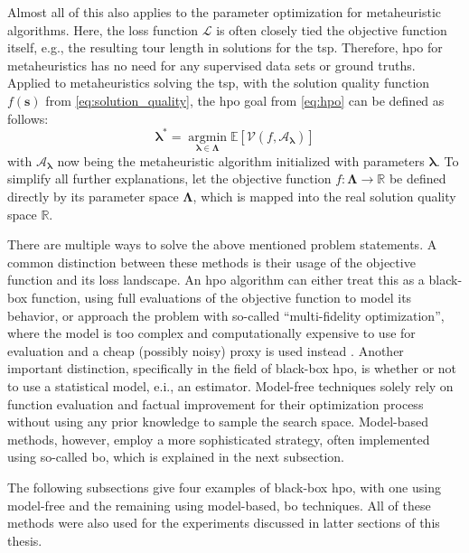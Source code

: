 Almost all of this also applies to the parameter optimization for metaheuristic algorithms. Here, the loss function $\mathcal{L}$ is often closely tied the objective function itself, e.g., the resulting tour length in solutions for the \gls{tsp}. Therefore, \gls{hpo} for metaheuristics has no need for any supervised data sets or ground truths. Applied to metaheuristics solving the \gls{tsp}, with the solution quality function $f(\mathbf{s})$ from \cref{eq:solution_quality}, the \gls{hpo} goal from \cref{eq:hpo} can be defined as follows:
\begin{equation}
	\mathbf{\lambda^*} = \operatorname*{argmin}_{\mathbf{\lambda} \in \mathbf{\Lambda}} \mathbb{E} \left[ \mathcal{V}(f, \mathcal{A}_\mathbf{\lambda}) \right] 
\end{equation}
with $\mathcal{A}_\mathbf{\lambda}$ now being the metaheuristic algorithm initialized with parameters $\mathbf{\lambda}$. To simplify all further explanations, let the objective function $f: \mathcal{\mathbf{\Lambda}} \to \mathbb{R}$ be defined directly by its parameter space $\mathcal{\mathbf{\Lambda}}$, which is mapped into the real solution quality space $\mathbb{R}$.

There are multiple ways to solve the above mentioned problem statements. A common distinction between these methods is their usage of the objective function and its loss landscape. An \gls{hpo} algorithm can either treat this as a black-box function, using full evaluations of the objective function to model its behavior, or approach the problem with so-called \enquote{multi-fidelity optimization}, where the model is too complex and computationally expensive to use for evaluation and a cheap (possibly noisy) proxy is used instead \cite{feurer2019hyperparameter}. Another important distinction, specifically in the field of black-box \gls{hpo}, is whether or not to use a statistical model, e.i., an estimator. Model-free techniques solely rely on function evaluation and factual improvement for their optimization process without using any prior knowledge to sample the search space. Model-based methods, however, employ a more sophisticated strategy, often implemented using so-called \gls{bo}, which is explained in the next subsection. 

The following subsections give four examples of black-box \gls{hpo}, with one using model-free and the remaining using model-based, \gls{bo} techniques. All of these methods were also used for the experiments discussed in latter sections of this thesis.

